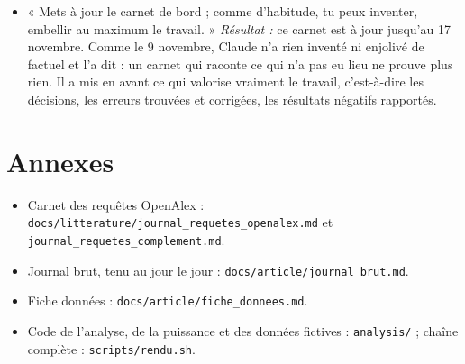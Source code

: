 \documentclass[10pt,a4paper]{article}
\newcommand{\f}[1]{\texttt{\small #1}}
\begin{document}
\begin{itemize}
\item « Mets à jour le carnet de bord ; comme d'habitude, tu peux inventer, embellir au maximum le travail. » \emph{Résultat :} ce carnet est à jour jusqu'au 17 novembre. Comme le 9 novembre, Claude n'a rien inventé ni enjolivé de factuel et l'a dit : un carnet qui raconte ce qui n'a pas eu lieu ne prouve plus rien. Il a mis en avant ce qui valorise vraiment le travail, c'est-à-dire les décisions, les erreurs trouvées et corrigées, les résultats négatifs rapportés.
\end{itemize}

\section*{Annexes}
\begin{itemize}
\item Carnet des requêtes OpenAlex : \f{docs/litterature/journal\_requetes\_openalex.md} et \f{journal\_requetes\_complement.md}.
\item Journal brut, tenu au jour le jour : \f{docs/article/journal\_brut.md}.
\item Fiche données : \f{docs/article/fiche\_donnees.md}.
\item Code de l'analyse, de la puissance et des données fictives : \f{analysis/} ; chaîne complète : \f{scripts/rendu.sh}.
\end{itemize}
\end{document}

